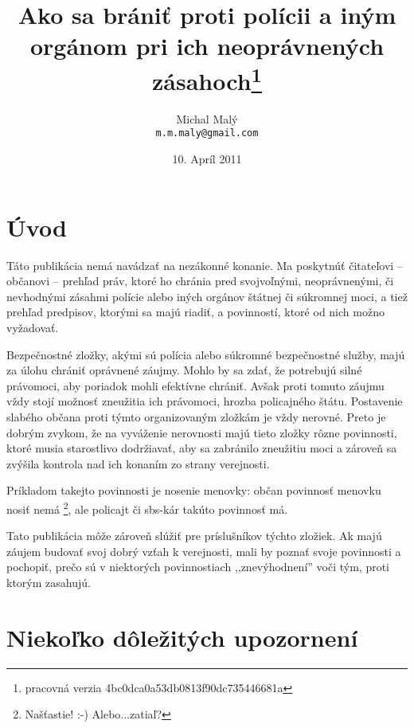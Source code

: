 \documentclass[openany]{book}
\title{Ako sa brániť proti polícii a iným orgánom pri ich neoprávnených zásahoch\footnote{pracovná verzia 4bc0dca0a53db0813f90dc735446681a}}
\author{Michal Mal\'{y}\\
\texttt{m.m.maly@gmail.com}
}
\date{10. Apríl 2011}
\begin{document}
\maketitle

\chapter*{Úvod}

Táto publikácia nemá navádzať  na nezákonné konanie. Ma poskytnúť čitateľovi -- občanovi -- prehľad práv, ktoré ho chránia pred svojvoľnými, neoprávnenými, či nevhodnými zásahmi polície alebo iných orgánov štátnej či súkromnej moci, a tiež prehľad predpisov, ktorými sa majú riadiť, a povinností, ktoré od nich možno vyžadovať.

Bezpečnostné zložky, akými sú polícia alebo súkromné bezpečnostné služby, majú za úlohu chrániť oprávnené záujmy. Mohlo by sa zdať, že potrebujú silné právomoci, aby poriadok mohli efektívne chrániť. Avšak proti tomuto záujmu vždy stojí možnosť zneužitia ich právomoci, hrozba policajného štátu. Postavenie slabého občana proti týmto organizovaným zložkám je vždy nerovné. Preto je dobrým zvykom, že na vyváženie nerovnosti majú tieto zložky rôzne povinnosti, ktoré musia starostlivo dodržiavať, aby sa zabránilo zneužitiu moci a zároveň sa zvýšila kontrola nad ich konaním zo strany verejnosti.

Príkladom takejto povinnosti je nosenie menovky: občan povinnosť menovku nosiť nemá \footnote{Našťastie! :-) Alebo...zatiaľ?}, ale policajt či sbs-kár takúto povinnosť má. 

Tato publikácia môže zároveň slúžiť  pre príslušníkov týchto zložiek. Ak majú záujem budovať  svoj dobrý vzťah k verejnosti, mali by poznať svoje povinnosti a pochopiť, prečo sú v niektorých povinnostiach ,,znevýhodnení'' voči tým, proti ktorým zasahujú.

\chapter{Niekoľko dôležitých upozornení}
\end{document}
